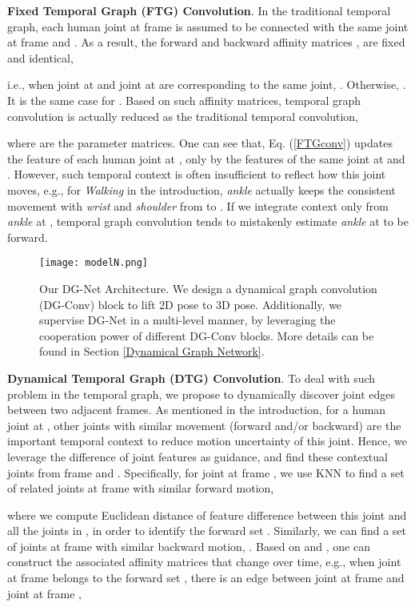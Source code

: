 \documentclass[journal]{IEEEtran}
\begin{document}
\textbf{Fixed Temporal Graph (FTG) Convolution}.
In the traditional temporal graph,
each human joint at frame  is assumed to be connected with the same joint at frame  and .
As a result,
the forward and backward affinity matrices ,  are fixed and identical,

i.e.,
when joint  at  and joint  at  are corresponding to the same joint,
.
Otherwise,
.
It is the same case for .
Based on such affinity matrices,
temporal graph convolution is actually reduced as the traditional temporal convolution,

where
 are the parameter matrices.
One can see that,
Eq. (\ref{FTGconv}) updates the feature of each human joint at ,
only by the features of the same joint at  and .
However,
such temporal context is often insufficient to reflect how this joint moves,
e.g.,
for \textit{Walking} in the introduction,
\textit{ankle} actually keeps the consistent movement with \textit{wrist} and \textit{shoulder} from  to .
If we integrate context only from \textit{ankle} at ,
temporal graph convolution tends to mistakenly estimate \textit{ankle} at  to be forward.
\
\begin{figure*}[t]
\centering
\texttt{[image: modelN.png]}
\caption{Our DG-Net Architecture.
We design a dynamical graph convolution (DG-Conv) block to lift 2D pose to 3D pose.
Additionally,
we supervise DG-Net in a multi-level manner,
by leveraging the cooperation power of different DG-Conv blocks.
More details can be found in Section \ref{Dynamical Graph Network}.}
\label{Network-architecture}

\end{figure*}

\textbf{Dynamical Temporal Graph (DTG) Convolution}.
To deal with such problem in the temporal graph,
we propose to dynamically discover joint edges between two adjacent frames.
As mentioned in the introduction,
for a human joint at ,
other joints with similar movement (forward and/or backward) are the important temporal context to reduce motion uncertainty of this joint.
Hence,
we leverage the difference of joint features as guidance,
and find these contextual joints from frame  and .
Specifically,
for joint  at frame ,
we use KNN to find a set of  related joints at frame  with similar forward motion,

where
we compute Euclidean distance of feature difference between this joint  and all the joints in ,
in order to identify the forward set .
Similarly,
we can find a set of  joints at frame  with similar backward motion,
.
Based on  and ,
one can construct the associated affinity matrices that change over time,
e.g.,
when joint  at frame  belongs to the forward set ,
there is an edge between joint  at frame  and joint  at frame ,
\end{document}
